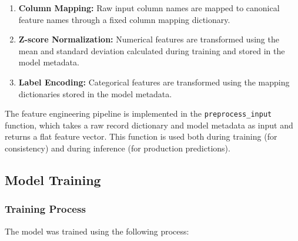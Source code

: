 \begin{enumerate}
  \item \textbf{Column Mapping:} Raw input column names are mapped to canonical feature names through a fixed column mapping dictionary.
  \item \textbf{Z-score Normalization:} Numerical features are transformed using the mean and standard deviation calculated during training and stored in the model metadata.
  \item \textbf{Label Encoding:} Categorical features are transformed using the mapping dictionaries stored in the model metadata.
\end{enumerate}

The feature engineering pipeline is implemented in the \texttt{preprocess\_input} function, which takes a raw record dictionary and model metadata as input and returns a flat feature vector. This function is used both during training (for consistency) and during inference (for production predictions).

\subsection{Model Training}

\subsubsection{Training Process}

The model was trained using the following process:

